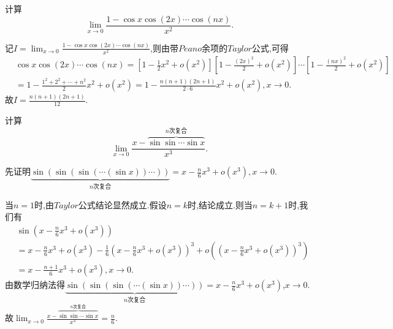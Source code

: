 \documentclass[../../main.tex]{subfiles}
\begin{document}
\begin{example}
计算
\[
\lim_{x \to 0} \frac{1 - \cos x \cos(2x) \cdots \cos(nx)}{x^2}.
\]
\end{example}
\begin{solution}
记$I=\lim_{x \to 0} \frac{1 - \cos x \cos(2x) \cdots \cos(nx)}{x^2}$,则由带$Peano$余项的$Taylor$公式,可得
\begin{align*}
&\cos x \cos(2x) \cdots \cos(nx)
=\left[1 - \frac{1}{2}x^2 + o(x^2)\right]\left[1 - \frac{(2x)^2}{2} + o(x^2)\right] \cdots \left[1 - \frac{(nx)^2}{2} + o(x^2)\right]
\\
&= 1 - \frac{1^2 + 2^2 + \cdots + n^2}{2}x^2 + o(x^2)
= 1 - \frac{n(n + 1)(2n + 1)}{2 \cdot 6}x^2 + o(x^2),x\to0.
\end{align*}
故\(I = \frac{n(n + 1)(2n + 1)}{12}\).
\end{solution}

\begin{example}
计算
\[
\lim_{x\rightarrow 0} \frac{x-\overset{n\text{次复合}}{\overbrace{\sin\sin \cdots \sin x}}}{x^3}.
\]
\end{example}
\begin{solution}
先证明\(\underbrace{\sin(\sin(\sin(\cdots (\sin x))\cdots))}_{n\text{次复合}} = x - \frac{n}{6}x^3 + o(x^3),x\to0\).

当\(n = 1\)时,由$Taylor$公式结论显然成立.假设\(n=k\)时,结论成立.则当\(n=k + 1\)时,我们有
\begin{align*}
&\sin\left(x - \frac{n}{6}x^3 + o(x^3)\right)
\\
&= x - \frac{n}{6}x^3 + o(x^3) - \frac{1}{6}\left(x - \frac{n}{6}x^3 + o(x^3)\right)^3 + o\left(\left(x - \frac{n}{6}x^3 + o(x^3)\right)^3\right)
\\
&= x - \frac{n + 1}{6}x^3 + o(x^3),x\to0.
\end{align*}
由数学归纳法得\(\underbrace{\sin(\sin(\sin(\cdots (\sin x))\cdots))}_{n\text{次复合}} = x - \frac{n}{6}x^3 + o(x^3)\),$x\to0$.
故$\lim_{x\rightarrow 0} \frac{x-\overset{n\text{次复合}}{\overbrace{\sin\sin \cdots \sin x}}}{x^3}=\frac{n}{6}.$
\end{solution}
\end{document}
